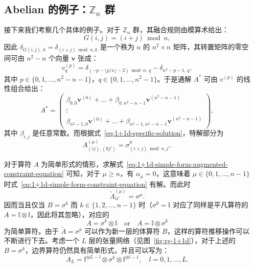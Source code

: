 \subsection{Abelian 的例子：\texorpdfstring{$\mathbb{Z}_n$}{ℤₙ} 群}

接下来我们考察几个具体的例子。对于 $\mathbb{Z}_n$ 群，其融合规则由模算术给出：
\begin{equation}
  G(i,j) = (i+j)\bmod n,
  \label{eq:Z_n-fusion-rules}
\end{equation}
因此 $\delta_{G(i,j),k}=\delta_{(i+j)\bmod n,k}$ 是一个秩为 $n$ 的 $n^2\times n$ 矩阵，其转置矩阵的零空间可由 $n^2-n$ 个向量 $\bm{v}$ 张成：
\begin{equation}
  v^{(p)}_q = \delta_{(-p-\lfloor p/n\rfloor-2)\bmod n, \, q} - \delta_{n^2-p-1, \, q},
\end{equation}
其中 $p\in\{0,1,\dots,n^2-n-1\}$，$q\in\{0,1,\dots,n^2-1\}$。于是通解 $A^*$ 可由 $v^{(p)}$ 的线性组合给出：
\begin{equation}
  A^* = \begin{pmatrix}
    \beta_{0,0} \bm{v}^{(0)} + \dots + \beta_{0,n^2-n-1} \bm{v}^{(n^2-n-1)} \\
    \vdots \\
    \beta_{n^2-1,0} \bm{v}^{(0)} + \dots + \beta_{n^2-1,n^2-n-1} \bm{v}^{(n^2-n-1)}
  \end{pmatrix},
\end{equation}
其中 $\beta_{i,j}$ 是任意常数。而根据式~\eqref{eq:1+1d-specific-solution}，特解部分为
\begin{equation}
  A^{(\mu)}_{(ij), (0j')} = \sigma^\mu_{(i+j)\bmod n, j'}.
\end{equation}

对于算符 $A$ 为简单形式的情形，求解式~\eqref{eq:1+1d-simple-form-augmented-constraint-equation} 可知，对于 $\mu\geqslant n$，有 $\alpha_\mu=0$，这意味着 $\mu\in\{0,1,\dots,n-1\}$ 时式~\eqref{eq:1+1d-simple-form-constraint-equation} 有解。而此时
\begin{equation}
  \tilde{A}^{(\mu)}_{ii'} = \sigma^\mu.
\end{equation}
因而当且仅当 $B=\sigma^k$ 而 $k\in\{1,2,\dots,n-1\}$ 时（$\sigma^0=\mathbb{I}$ 对应了同样是平凡算符的 $A=\mathbb{I}\otimes\mathbb{I}$，因此将其忽略），对应的
\begin{equation}
  A = \sigma^k   \otimes \mathbb{I} \quad \text{or} \quad
  A = \mathbb{I} \otimes \sigma^k
\end{equation}
为简单算符。由于 $\tilde{A}=\sigma^k$ 可以作为新一层的体算符 $B$，这样的算符推移操作可以不断进行下去。考虑一个 $L$ 层的张量网络（见图~\ref{fig:rg-1+1d}），对于上述的 $B=\sigma^k$，边界算符仍然具有简单形式，并且可以写为：
\begin{equation}
  A_L = \mathbb{I}^{\otimes L-l} \otimes \sigma^k \otimes \mathbb{I}^{\otimes l-1}, \quad l = 0,1,\dots,L.
\end{equation}

